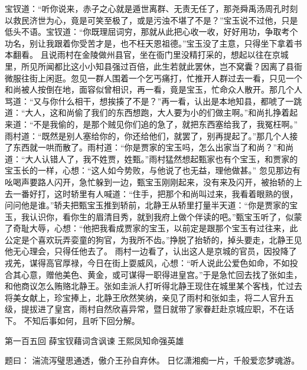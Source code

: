 \documentclass[12pt,oneside]{book}
\begin{document}
宝钗道：“听你说来，赤子之心就是遁世离群、无责无任了，那尧舜禹汤周孔时刻以救民济世为心，竟是可笑至极了，或是污浊不堪了不是？”宝玉说不过他，只是低头不语。宝钗道：“你既理屈词穷，那就从此把心收一收，好好用功，争取考个功名，别让我跟着你受苦才是，也不枉天恩祖德。”宝玉没了主意，只得坐下拿着书本翻看。
且说雨村在金陵做州县官，坐在衙门里没精打采的，想起以往在京城里，所见所闻都比这小小知县强过百倍，此生若就此罢休，岂不窝囊？因离了县衙微服往街上闲逛。忽见一群人围着一个乞丐痛打，忙推开人群过去一看，只见一个和尚被人按倒在地，面容似曾相识，再一看，竟是宝玉，忙命众人散开。那几个人骂道：“又与你什么相干，想挨揍了不是？”再一看，认出是本地知县，都唬了一跳道：“大人，这和尚偷了我们的东西想跑，大人要为小的们做主啊。”和尚扎挣着起来道：“不是我偷的，是那个贼见你们追的急了，就把东西塞给我了，我冤枉啊。”
雨村道：“既然是别人塞给你的，你还给他们，就罢了，别再提起了。”那几个人接了东西就一哄而散了。雨村道：“你是贾家的宝玉吗，怎么出家当了和尚？”和尚道：“大人认错人了，我不姓贾，姓甄。”雨村猛然想起甄家也有个宝玉，和贾家的宝玉长的一样，心想：“这人如今势败，与他说了也无益，理他做甚。”
忽见那边有吆喝声要路人闪开，急忙躲到一边，甄宝玉刚刚起来，没有来及闪开，被抬轿的上去一番好打，这时轿里有人喊道：“住手，把那个和尚叫过来，我看着眼熟的很，问问他是谁。”轿夫把甄宝玉推到轿前，北静王从轿里打量半天道：“你是贾家的宝玉，我认识你，看你生的眉清目秀，就到我府上做个伴读的吧。”甄宝玉听了，似蒙了奇耻大辱，心想：“他把我看成贾家的宝玉，以前定是跟那个宝玉有过往来，此公定是个喜欢玩弄娈童的狗官，为我所不齿。”挣脱了抬轿的，掉头要走，北静王见他无心理会，只得任他去了。
雨村一边看了，认出这人是京城的官员，因投降了戎羌，谋得高官厚禄，今日在街上耍威风，心想：“听人说此公爱色如命，不如投合其心意，赠他美色、黄金，或可谋得一职得进皇宫。”于是急忙回去找了张如圭，和他商议怎么贿赂北静王。张如圭派人打听得北静王现住在城里某个客栈，忙过去将美女献上，珍宝捧上，北静王欣然笑纳，亲见了雨村和张如圭，将二人官升五级，提拔进了皇宫，雨村自然欣喜异常，暨日就带了家眷赶赴京城应职，不在话下。
不知后事如何，且听下回分解。
 
第一百五回 薛宝钗藉词含讽谏 王熙凤知命强英雄

题曰：
湍流泻璧思通透，傲介王孙自弃休。
日忆潇湘痴一片，千般爱恋梦魂游。
\end{document}
